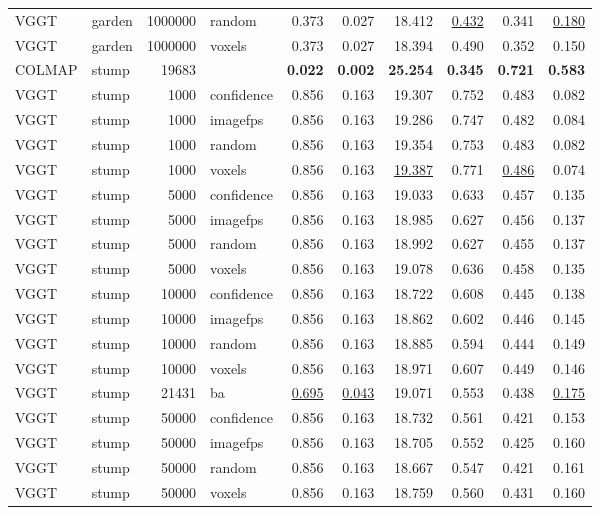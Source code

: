 \begin{table}[H]
\begin{tabular}{llrlrrrrrr}
VGGT & garden & 1000000 & random & 0.373 & 0.027 & 18.412 & \underline{0.432} & 0.341 & \underline{0.180} \\
VGGT & garden & 1000000 & voxels & 0.373 & 0.027 & 18.394 & 0.490 & 0.352 & 0.150 \\
\midrule
COLMAP & stump & 19683 &  & \textbf{0.022} & \textbf{0.002} & \textbf{25.254} & \textbf{0.345} & \textbf{0.721} & \textbf{0.583} \\
VGGT & stump & 1000 & confidence & 0.856 & 0.163 & 19.307 & 0.752 & 0.483 & 0.082 \\
VGGT & stump & 1000 & imagefps & 0.856 & 0.163 & 19.286 & 0.747 & 0.482 & 0.084 \\
VGGT & stump & 1000 & random & 0.856 & 0.163 & 19.354 & 0.753 & 0.483 & 0.082 \\
VGGT & stump & 1000 & voxels & 0.856 & 0.163 & \underline{19.387} & 0.771 & \underline{0.486} & 0.074 \\
VGGT & stump & 5000 & confidence & 0.856 & 0.163 & 19.033 & 0.633 & 0.457 & 0.135 \\
VGGT & stump & 5000 & imagefps & 0.856 & 0.163 & 18.985 & 0.627 & 0.456 & 0.137 \\
VGGT & stump & 5000 & random & 0.856 & 0.163 & 18.992 & 0.627 & 0.455 & 0.137 \\
VGGT & stump & 5000 & voxels & 0.856 & 0.163 & 19.078 & 0.636 & 0.458 & 0.135 \\
VGGT & stump & 10000 & confidence & 0.856 & 0.163 & 18.722 & 0.608 & 0.445 & 0.138 \\
VGGT & stump & 10000 & imagefps & 0.856 & 0.163 & 18.862 & 0.602 & 0.446 & 0.145 \\
VGGT & stump & 10000 & random & 0.856 & 0.163 & 18.885 & 0.594 & 0.444 & 0.149 \\
VGGT & stump & 10000 & voxels & 0.856 & 0.163 & 18.971 & 0.607 & 0.449 & 0.146 \\
VGGT & stump & 21431 & ba & \underline{0.695} & \underline{0.043} & 19.071 & 0.553 & 0.438 & \underline{0.175} \\
VGGT & stump & 50000 & confidence & 0.856 & 0.163 & 18.732 & 0.561 & 0.421 & 0.153 \\
VGGT & stump & 50000 & imagefps & 0.856 & 0.163 & 18.705 & 0.552 & 0.425 & 0.160 \\
VGGT & stump & 50000 & random & 0.856 & 0.163 & 18.667 & 0.547 & 0.421 & 0.161 \\
VGGT & stump & 50000 & voxels & 0.856 & 0.163 & 18.759 & 0.560 & 0.431 & 0.160 \\

\end{tabular}
\end{table}
